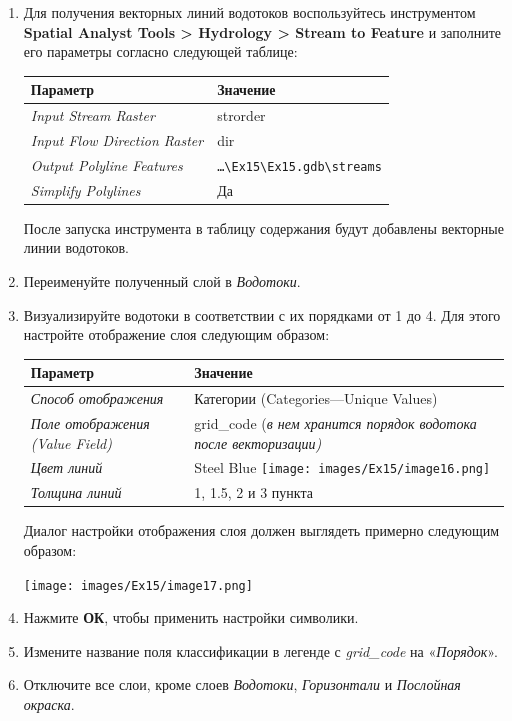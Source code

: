 \documentclass[12pt,]{book}
\begin{document}
\begin{enumerate}
\def\labelenumi{\arabic{enumi}.}
\item
  Для получения векторных линий водотоков воспользуйтесь инструментом \textbf{Spatial Analyst Tools \textgreater{} Hydrology \textgreater{} Stream to Feature} и заполните его параметры согласно следующей таблице:

  \begin{longtable}[]{@{}ll@{}}
  \toprule
  Параметр & Значение\tabularnewline
  \midrule
  \endhead
  \emph{Input Stream Raster} & strorder\tabularnewline
  \emph{Input Flow Direction Raster} & dir\tabularnewline
  \emph{Output Polyline Features} & \texttt{\ldots{}\textbackslash{}Ex15\textbackslash{}Ex15.gdb\textbackslash{}streams}\tabularnewline
  \emph{Simplify Polylines} & Да\tabularnewline
  \bottomrule
  \end{longtable}

  После запуска инструмента в таблицу содержания будут добавлены векторные линии водотоков.
\item
  Переименуйте полученный слой в \emph{Водотоки}.
\item
  Визуализируйте водотоки в соответствии с их порядками от 1 до 4. Для этого настройте отображение слоя следующим образом:

  \begin{longtable}[]{@{}ll@{}}
  \toprule
  Параметр & Значение\tabularnewline
  \midrule
  \endhead
  \emph{Способ отображения} & Категории (Categories---Unique Values)\tabularnewline
  \emph{Поле отображения (Value Field)} & grid\_code (\emph{в нем хранится порядок водотока после векторизации)}\tabularnewline
  \emph{Цвет линий} & Steel Blue \texttt{[image: images/Ex15/image16.png]}\tabularnewline
  \emph{Толщина линий} & 1, 1.5, 2 и 3 пункта\tabularnewline
  \bottomrule
  \end{longtable}

  Диалог настройки отображения слоя должен выглядеть примерно следующим образом:

  \texttt{[image: images/Ex15/image17.png]}
\item
  Нажмите \textbf{ОК}, чтобы применить настройки символики.
\item
  Измените название поля классификации в легенде с \emph{grid\_code} на «\emph{Порядок}».
\item
  Отключите все слои, кроме слоев \emph{Водотоки}, \emph{Горизонтали} и \emph{Послойная окраска}.
\end{enumerate}
\end{document}
